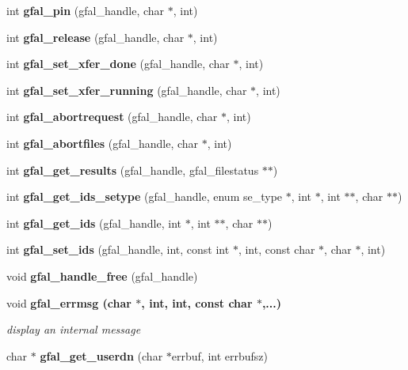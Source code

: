 \begin{CompactItemize}
\item 
int \textbf{gfal\_\-pin} (gfal\_\-handle, char $\ast$, int)\label{gfal__common_8h_9764581af9643f6d3f014b2bc9d5c4ac}

\item 
int \textbf{gfal\_\-release} (gfal\_\-handle, char $\ast$, int)\label{gfal__common_8h_d67e1b55d16fbcc9c02e0ab44bbed7bd}

\item 
int \textbf{gfal\_\-set\_\-xfer\_\-done} (gfal\_\-handle, char $\ast$, int)\label{gfal__common_8h_0dd3f7181d48d5311146106ec2eaba8a}

\item 
int \textbf{gfal\_\-set\_\-xfer\_\-running} (gfal\_\-handle, char $\ast$, int)\label{gfal__common_8h_e907a676c77e646e5a878e1db1fdcd96}

\item 
int \textbf{gfal\_\-abortrequest} (gfal\_\-handle, char $\ast$, int)\label{gfal__common_8h_c38428bec7d99cd8e97f8c2cecb02c26}

\item 
int \textbf{gfal\_\-abortfiles} (gfal\_\-handle, char $\ast$, int)\label{gfal__common_8h_492b7ad68bbcc21f29a4f7de5787bd58}

\item 
int \textbf{gfal\_\-get\_\-results} (gfal\_\-handle, gfal\_\-filestatus $\ast$$\ast$)\label{gfal__common_8h_eae3f1d564f4e403597f5024c3d2d606}

\item 
int \textbf{gfal\_\-get\_\-ids\_\-setype} (gfal\_\-handle, enum se\_\-type $\ast$, int $\ast$, int $\ast$$\ast$, char $\ast$$\ast$)\label{gfal__common_8h_2bed7d372296a8d43282cea69ccb663e}

\item 
int \textbf{gfal\_\-get\_\-ids} (gfal\_\-handle, int $\ast$, int $\ast$$\ast$, char $\ast$$\ast$)\label{gfal__common_8h_72418d9d0374b8beca6fca284a8e5db2}

\item 
int \textbf{gfal\_\-set\_\-ids} (gfal\_\-handle, int, const int $\ast$, int, const char $\ast$, char $\ast$, int)\label{gfal__common_8h_5da8c01443270bf26cb6f60fe1457c53}

\item 
void \textbf{gfal\_\-handle\_\-free} (gfal\_\-handle)\label{gfal__common_8h_a21bc6b4163400d28590637b474a1b05}

\item 
void \bf{gfal\_\-errmsg} (char $\ast$, int, int, const char $\ast$,...)
\begin{CompactList}\small\item\em display an internal message \item\end{CompactList}\item 
char $\ast$ \textbf{gfal\_\-get\_\-userdn} (char $\ast$errbuf, int errbufsz)\label{group__internal__group_g6bd6336b0fee1ff32ad6bc5ef3d96068}


\end{CompactItemize}
